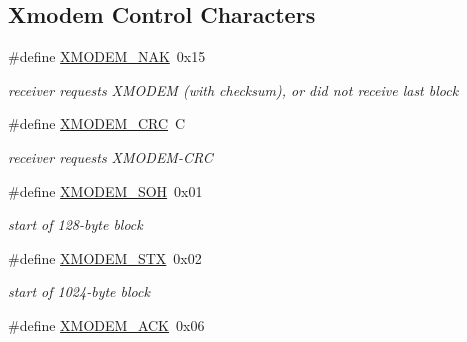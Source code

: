 \subsection*{Xmodem Control Characters}
\begin{DoxyCompactItemize}
\item 
\mbox{\label{group__util__xmodem_ga23d8e7fbbf55d1899984aad6f2dd0c77}} 
\#define \hyperlink{group__util__xmodem_ga23d8e7fbbf55d1899984aad6f2dd0c77}{X\+M\+O\+D\+E\+M\+\_\+\+N\+AK}~0x15
\begin{DoxyCompactList}\small\item\em receiver requests X\+M\+O\+D\+EM (with checksum), or did not receive last block \end{DoxyCompactList}\item 
\mbox{\label{group__util__xmodem_ga5a28173b1f4d064e2b81c71394fe0d82}} 
\#define \hyperlink{group__util__xmodem_ga5a28173b1f4d064e2b81c71394fe0d82}{X\+M\+O\+D\+E\+M\+\_\+\+C\+RC}~\textquotesingle{}C\textquotesingle{}
\begin{DoxyCompactList}\small\item\em receiver requests X\+M\+O\+D\+E\+M-\/\+C\+RC \end{DoxyCompactList}\item 
\mbox{\label{group__util__xmodem_ga516766421552c726b2859228d39b867e}} 
\#define \hyperlink{group__util__xmodem_ga516766421552c726b2859228d39b867e}{X\+M\+O\+D\+E\+M\+\_\+\+S\+OH}~0x01
\begin{DoxyCompactList}\small\item\em start of 128-\/byte block \end{DoxyCompactList}\item 
\mbox{\label{group__util__xmodem_ga743b9b571f66fa34a38f8c23407a206f}} 
\#define \hyperlink{group__util__xmodem_ga743b9b571f66fa34a38f8c23407a206f}{X\+M\+O\+D\+E\+M\+\_\+\+S\+TX}~0x02
\begin{DoxyCompactList}\small\item\em start of 1024-\/byte block \end{DoxyCompactList}\item 
\mbox{\label{group__util__xmodem_ga15cc4ebc5babe213c14409b8dcc08151}} 
\#define \hyperlink{group__util__xmodem_ga15cc4ebc5babe213c14409b8dcc08151}{X\+M\+O\+D\+E\+M\+\_\+\+A\+CK}~0x06

\end{DoxyCompactItemize}
